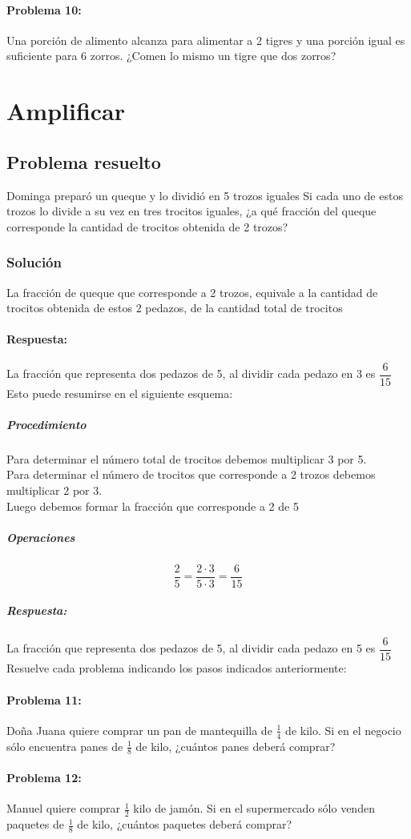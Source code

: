 \documentclass[10pt,twoside]{article}
\begin{document}
\paragraph*{Problema 10:}
Una porción de alimento alcanza para alimentar a 2 tigres y una porción igual es suficiente para 6 zorros. ¿Comen lo mismo un tigre que dos zorros?
\section*{Amplificar}
\subsection*{Problema resuelto}
Dominga preparó un queque y lo dividió en 5 trozos iguales Si cada uno de estos trozos lo divide a su vez en tres trocitos iguales, ¿a qué fracción del queque corresponde la cantidad de trocitos obtenida de 2 trozos?
\subsubsection*{Soluci\'{o}n}
La fracción de queque que corresponde a 2 trozos, equivale a la cantidad de trocitos obtenida de estos 2 pedazos, de la cantidad total de trocitos
\paragraph*{Respuesta:} 
La fracción que representa dos pedazos de 5, al dividir cada pedazo en 3 es $\dfrac{6}{15}$\\
Esto puede resumirse en el siguiente esquema:
\subparagraph*{Procedimiento}
Para determinar el número total de trocitos debemos multiplicar 3 por 5.\\
Para determinar el número de trocitos que corresponde a 2 trozos debemos multiplicar 2 por 3.\\
Luego debemos formar la fracción que corresponde a 2 de 5
\subparagraph*{Operaciones}
\[\dfrac{2}{5}=\dfrac{2\cdot 3}{5\cdot 3}=\dfrac{6}{15}\]
\subparagraph*{Respuesta:}
La fracción que representa dos pedazos de 5, al dividir cada pedazo en 5 es $\dfrac{6}{15}$
Resuelve cada problema indicando los pasos indicados anteriormente:
\paragraph*{Problema 11:}
Doña Juana quiere comprar un pan de mantequilla de $\frac{1} {4}$ de kilo. Si en el negocio sólo encuentra panes de $\frac{1}{8}$ de kilo, ¿cuántos panes deberá comprar?
\paragraph*{Problema 12:}
Manuel quiere comprar $\frac{1}{2}$ kilo de jamón. Si en el supermercado sólo venden paquetes de $\frac{1}{8}$ de kilo, ¿cuántos paquetes deberá comprar?
\end{document}
